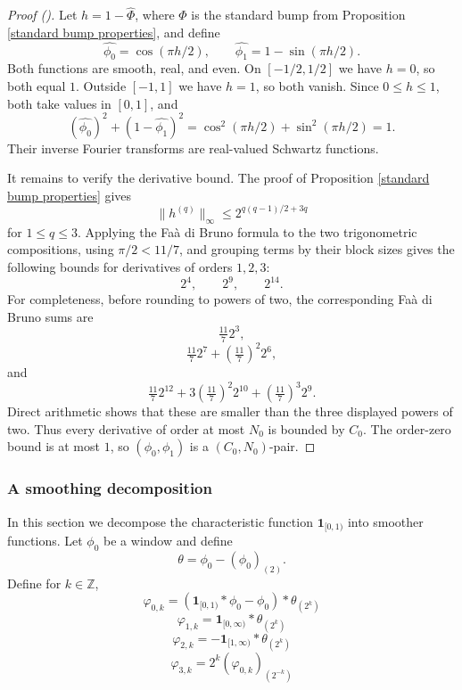 \documentclass[12pt,reqno]{amsart}
\newcommand{\auto}{{({\tiny\faCar})}}
\theoremstyle{plain}
\numberwithin{equation}{section}
\theoremstyle{remark}
\begin{document}
\begin{proof}[Proof \auto]
Let $h=1-\widehat\Phi$, where $\Phi$ is the standard bump from Proposition \ref{standard bump properties}, and define
\[
\widehat{\phi_0}=\cos(\pi h/2),
\qquad
\widehat{\phi_1}=1-\sin(\pi h/2).
\]
Both functions are smooth, real, and even. On $[-1/2,1/2]$ we have $h=0$, so both equal $1$. Outside $[-1,1]$ we have $h=1$, so both vanish. Since $0\le h\le1$, both take values in $[0,1]$, and
\[
(\widehat{\phi_0})^2+(1-\widehat{\phi_1})^2
=\cos^2(\pi h/2)+\sin^2(\pi h/2)=1.
\]
Their inverse Fourier transforms are real-valued Schwartz functions.

It remains to verify the derivative bound. The proof of Proposition \ref{standard bump properties} gives
\[
\|h^{(q)}\|_\infty
\le2^{q(q-1)/2+3q}
\]
for $1\le q\le3$. Applying the Fa\`a di Bruno formula to the two trigonometric compositions, using $\pi/2<11/7$, and grouping terms by their block sizes gives the following bounds for derivatives of orders $1,2,3$:
\[
2^4,
\qquad
2^9,
\qquad
2^{14}.
\]
For completeness, before rounding to powers of two, the corresponding Fa\`a di Bruno sums are
\[
\tfrac{11}{7}2^3,
\]
\[
\tfrac{11}{7}2^7+\left(\tfrac{11}{7}\right)^2 2^6,
\]
and
\[
\tfrac{11}{7}2^{12}+3\left(\tfrac{11}{7}\right)^2 2^{10}+\left(\tfrac{11}{7}\right)^3 2^9.
\]
Direct arithmetic shows that these are smaller than the three displayed powers of two. Thus every derivative of order at most $N_0$ is bounded by $C_0$. The order-zero bound is at most $1$, so $(\phi_0,\phi_1)$ is a $(C_0,N_0)$-pair.
\end{proof}


\subsubsection{A smoothing decomposition}
In this section we  decompose the characteristic function $\mathbf{1}_{[0,1)}$ into smoother functions.
Let $\phi_0$ be a window and define
\begin{equation}\label{eqn:thetadef}
{\theta}={\phi_0}-{(\phi_0)}_{(2)}.
\end{equation}
Define for $k\in\mathbb{Z}$,
\begin{equation}\label{eqn:varphi0kdef}
\varphi_{0,k} = (\mathbf{1}_{[0,1)}\ast\phi_0 - \phi_0)\ast \theta_{(2^{k})}
\end{equation}
\begin{equation}\label{eqn:varphi1kdef}\varphi_{1,k} = \mathbf{1}_{[0,\infty)}\ast\theta_{(2^k)}
\end{equation}
\begin{equation}\label{eqn:varphi2kdef}\varphi_{2,k} = -\mathbf{1}_{[1,\infty)}\ast\theta_{(2^k)}
\end{equation}
\begin{equation}\label{eqn:varphi3def}
\varphi_{3,k} = 2^{k}(\varphi_{0,k})_{(2^{-k})}
\end{equation}
\end{document}
